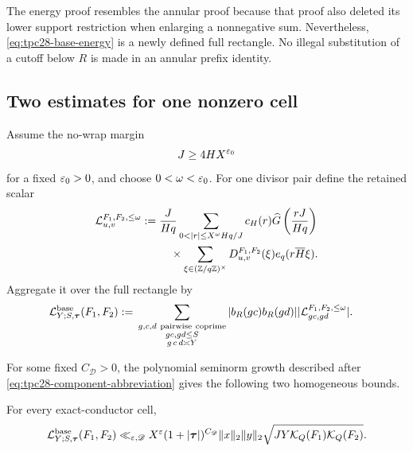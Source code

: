 \begin{remark}
\label{rem:tpc28-not-endpoint-substitution}
The energy proof resembles the annular proof because that proof also
deleted its lower support restriction when enlarging a nonnegative
sum.  Nevertheless, \eqref{eq:tpc28-base-energy} is a newly defined
full rectangle.  No illegal substitution of a cutoff below $R$ is
made in an annular prefix identity.
\end{remark}

\subsection{Two estimates for one nonzero cell}

Assume the no-wrap margin
\begin{equation}
 J\ge4HX^{\varepsilon_0}
 \label{eq:tpc28-no-wrap}
\end{equation}
for a fixed $\varepsilon_0>0$, and choose $0<\omega<\varepsilon_0$.  For one
divisor pair define the retained scalar
\begin{align}
 \cL_{u,v}^{F_1,F_2,\le\omega}
 :={}&\frac{J}{Hq}
 \sum_{0<|r|\le X^\omega Hq/J}
 c_H(r)\widehat G\left(\frac{rJ}{Hq}\right)
 \notag\\
 &\quad\times
 \sum_{\xi\in(\Z/q\Z)^\times}
 D_{u,v}^{F_1,F_2}(\xi)e_q(r\overline H\xi).
 \label{eq:tpc28-pair-cell-functional}
\end{align}
Aggregate it over the full rectangle by
\begin{align}
 \mathcal L^{\rm base}_{Y;S,\boldsymbol\tau}(F_1,F_2)
 :={}&\sum_{\substack{g,c,d\ \mathrm{pairwise\ coprime}\\
 gc,gd\le S\\g\,c\,d\asymp Y}}
 |b_R(gc)b_R(gd)|
 |\mathcal L_{gc,gd}^{F_1,F_2,\le\omega}|.
 \label{eq:tpc28-base-cell}
\end{align}

For some fixed $C_{\mathscr D}>0$, the polynomial seminorm growth
described after \eqref{eq:tpc28-component-abbreviation} gives the
following two homogeneous bounds.

\begin{lemma}
\label{lem:tpc28-norm-route}
For every exact-conductor cell,
\begin{equation}
 \mathcal L^{\rm base}_{Y;S,\boldsymbol\tau}(F_1,F_2)
 \ll_{\varepsilon,\mathscr D}X^\varepsilon
 (1+|\boldsymbol\tau|)^{C_{\mathscr D}}
 \|x\|_2\|y\|_2
 \sqrt{JY\mathcal K_Q(F_1)\mathcal K_Q(F_2)}.
 \label{eq:tpc28-norm-route}
\end{equation}
\end{lemma}

